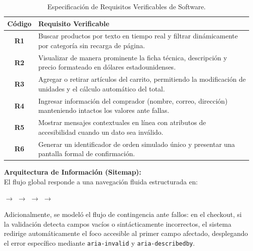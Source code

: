 \documentclass{article}
\begin{document}
\begin{table}[H]
\centering
\caption{Especificación de Requisitos Verificables de Software.}
\label{tab:requisitos}
\vspace{0.2cm}
\begin{tabularx}{\textwidth}{c X}
\toprule
\textbf{Código} & \textbf{Requisito Verificable} \\
\midrule
\textbf{R1} & Buscar productos por texto en tiempo real y filtrar dinámicamente por categoría sin recarga de página. \\
\textbf{R2} & Visualizar de manera prominente la ficha técnica, descripción y precio formateado en dólares estadounidenses. \\
\textbf{R3} & Agregar o retirar artículos del carrito, permitiendo la modificación de unidades y el cálculo automático del total. \\
\textbf{R4} & Ingresar información del comprador (nombre, correo, dirección) manteniendo intactos los valores ante fallas. \\
\textbf{R5} & Mostrar mensajes contextuales en línea con atributos de accesibilidad cuando un dato sea inválido. \\
\textbf{R6} & Generar un identificador de orden simulado único y presentar una pantalla formal de confirmación. \\
\bottomrule
\end{tabularx}
\end{table}

\textbf{Arquitectura de Información (Sitemap):} \\
El flujo global responde a una navegación fluida estructurada en:
\begin{center}
 $\longrightarrow$  $\longrightarrow$  $\longrightarrow$  $\longrightarrow$ 
\end{center}
Adicionalmente, se modeló el flujo de contingencia ante fallos: en el checkout, si la validación detecta campos vacíos o sintácticamente incorrectos, el sistema redirige automáticamente el foco accesible al primer campo afectado, desplegando el error específico mediante \texttt{aria-invalid} y \texttt{aria-describedby}.
\end{document}
